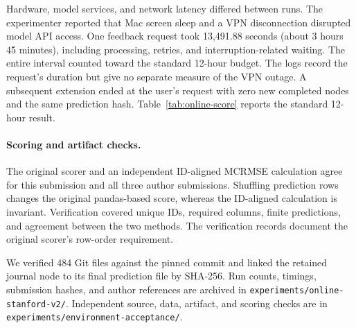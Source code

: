 Hardware, model services, and network latency differed between runs. The experimenter reported that Mac screen sleep and a VPN disconnection disrupted model API access. One feedback request took 13,491.88 seconds (about 3 hours 45 minutes), including processing, retries, and interruption-related waiting. The entire interval counted toward the standard 12-hour budget. The logs record the request's duration but give no separate measure of the VPN outage. A subsequent extension ended at the user's request with zero new completed nodes and the same prediction hash. Table~\ref{tab:online-score} reports the standard 12-hour result.

\paragraph{Scoring and artifact checks.}
The original scorer and an independent ID-aligned MCRMSE calculation agree for this submission and all three author submissions. Shuffling prediction rows changes the original pandas-based score, whereas the ID-aligned calculation is invariant. Verification covered unique IDs, required columns, finite predictions, and agreement between the two methods. The verification records document the original scorer's row-order requirement.

We verified 484 Git files against the pinned commit and linked the retained journal node to its final prediction file by SHA-256. Run counts, timings, submission hashes, and author references are archived in \texttt{experiments/online-stanford-v2/}. Independent source, data, artifact, and scoring checks are in \texttt{experiments/environment-acceptance/}.
